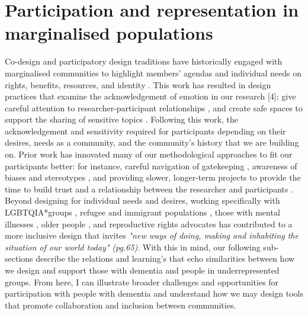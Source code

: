 \section{Participation and representation in marginalised populations}
\label{MP}
Co-design and participatory design traditions have historically engaged with marginalised communities to highlight members' agendas and individual needs on rights, benefits, resources, and identity \citep{devito_social_2019,porter_filtered_2017,scheuerman_safe_2018}. This work has resulted in design practices that examine the acknowledgement of emotion in our research [4]; give careful attention to researcher-participant relationships \citep{clarke_digital_2013}, and create safe spaces to support the sharing of sensitive topics \citep{lazar_safe_2019,talhouk_refugees_2016}. Following this work, the acknowledgement and sensitivity required for participants depending on their desires, needs as a community, and the community's history that we are building on. Prior work has innovated many of our methodological approaches to fit our participants better: for instance, careful navigation of gatekeeping \citep{sanghera_methodological_2008}, awareness of biases and stereotypes \citep{marsden_stereotypes_2016}, and providing slower, longer-term projects to provide the time to build trust and a relationship between the researcher and participants \citep{foley_care_2019}. Beyond designing for individual needs and desires, working specifically with LGBTQIA*groups \citep{byron_apps_2019}, refugee and immigrant populations \citep{talhouk_syrian_2016}, those with mental illnesses \citep{birbeck_self_2017}, older people \citep{reuter_older_2019}, and reproductive rights advocates \citep{michie_her_2018} has contributed to a more inclusive design that invites \textit{"new ways of doing, making and inhabiting the situation of our world today"\citep{rosner2018critical} (pg.65)}. With this in mind, our following sub-sections describe the relations and learning's that echo similarities between how we design and support those with dementia and people in underrepresented groups. From here, I can illustrate broader challenges and opportunities for participation with people with dementia and understand how we may design tools that promote collaboration and inclusion between communities. 

